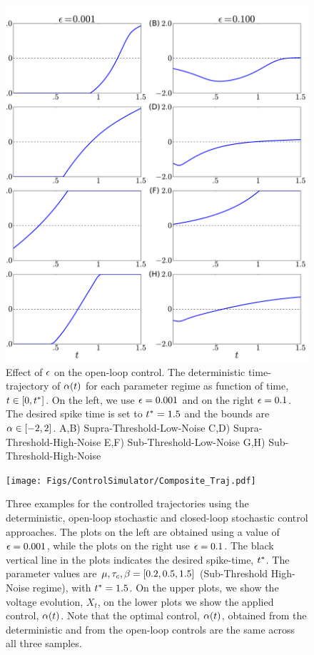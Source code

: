\documentclass[12pt]{iopart}
\begin{document}
\begin{figure}[htp]
\begin{center}
  \includegraphics[width=.99\textwidth]{Figs/FP_Adjoint/Regimes_eps_comparison.pdf}
  \caption[labelInTOC]{Effect of ${\epsilon}$ on the open-loop control.
  The deterministic time-trajectory of ${\alpha}(t)$ for each
  parameter regime as function of time, $t \in [0, { t^* }]$.
  On the left, we use ${\epsilon} = 0.001$ and on the right ${\epsilon} =0.1$.
  The desired spike time is set to ${ t^* }=1.5$ and the bounds are ${\alpha} \in [-2,2]$.
    A,B)
   Supra-Threshold-Low-Noise
  C,D) 
   Supra-Threshold-High-Noise
  E,F)
   Sub-Threshold-Low-Noise
  G,H)
   Sub-Threshold-High-Noise}
  \label{fig:FBK_Regimes_cs_different_es} 
\end{center}
\end{figure}

\begin{figure}[h]
\begin{center}
\texttt{[image: Figs/ControlSimulator/Composite\_Traj.pdf]}
\caption[]{Three examples for the controlled trajectories using the
deterministic, open-loop stochastic and closed-loop stochastic control approaches.
The plots on the left are obtained using a value of ${\epsilon}=0.001$, while the
plots on the right use ${\epsilon}=0.1$.
The black vertical line in the plots indicates the desired spike-time, ${ t^* }$.
The parameter values are ${\mu }, { \tau_{c} }, {\beta} = [0.2, 0.5,  1.5]$ (Sub-Threshold
High-Noise regime), with ${ t^* } = 1.5$. 
On the upper plots, we show the voltage evolution, $X_t$, on the lower plots we
show the applied control, ${\alpha}(t)$. Note that the optimal control, ${\alpha}(t)$, obtained from
the deterministic and from the open-loop controls are the same across all three
samples.}
\label{fig:control_trajectories_examples}
\end{center} 
\end{figure}
\end{document}
